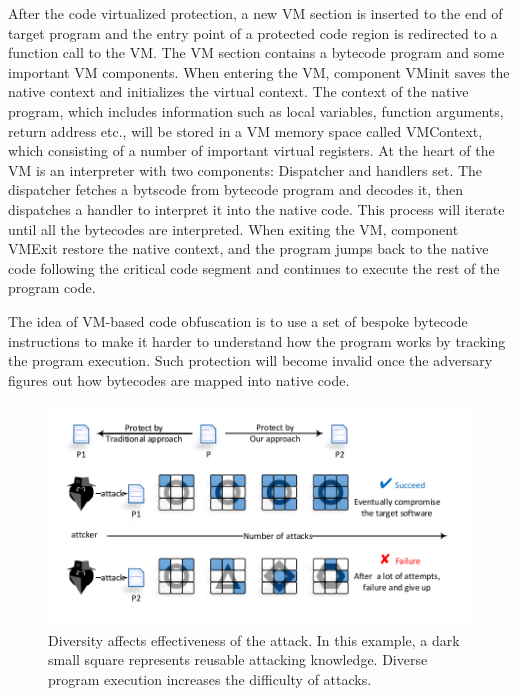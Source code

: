 \documentclass[preprint,12pt,3p]{elsarticle}
\begin{document}
After the code virtualized protection, a new VM section is inserted to the end of target program and the
entry point of a protected code region is redirected to a function call to the VM.
The VM section contains a bytecode program and some important VM components.
When entering the VM, component VMinit saves the native context and initializes the virtual context.
The context of the native program, which includes information such as local variables, function arguments, return address etc.,
will be stored in a VM memory space called VMContext, which consisting of a number of important virtual registers.
At the heart of the VM is an interpreter with two components: Dispatcher and handlers set.
The dispatcher fetches a bytscode from bytecode program and decodes it, then dispatches a handler to interpret it into the native code.
This process will iterate until all the bytecodes are interpreted. When exiting the VM, component VMExit restore the native context,
and the program jumps back to the native code following the critical code segment and continues to execute the rest of the program code.

The idea of VM-based code obfuscation is to use a set of bespoke bytecode instructions to
make it harder to understand how the program works by tracking the program execution.
Such protection will become invalid once the adversary figures out how bytecodes are mapped into native code.

\begin{figure}[t]%
    \centering
    \includegraphics[width=0.7\columnwidth]{figure/figone.pdf}
    \caption{Diversity affects effectiveness of the attack. In this example, a dark small square represents reusable attacking knowledge. Diverse program execution increases the difficulty of attacks.}\label{fig:Fig.1}
\end{figure}
\end{document}
